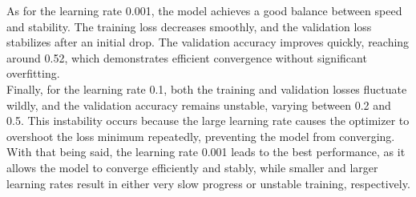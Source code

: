 \documentclass[12pt,a4paper]{article}
\begin{document}
        As for the learning rate 0.001, the model achieves a good balance between speed and stability. The training loss decreases smoothly, and the validation loss stabilizes after an initial drop. The validation accuracy improves quickly, reaching around 0.52, which demonstrates efficient convergence without significant overfitting. \\
        Finally, for the learning rate 0.1, both the training and validation losses fluctuate wildly, and the validation accuracy remains unstable, varying between 0.2 and 0.5. This instability occurs because the large learning rate causes the optimizer to overshoot the loss minimum repeatedly, preventing the model from converging. \\
        With that being said, the learning rate 0.001 leads to the best performance, as it allows the model to converge efficiently and stably, while smaller and larger learning rates result in either very slow progress or unstable training, respectively.

    \newpage
\end{document}
